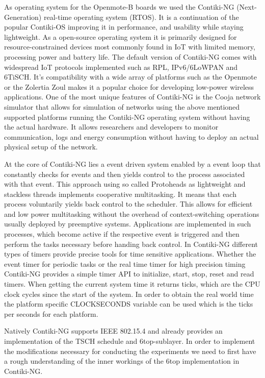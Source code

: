 \documentclass{comnets-thesis}
\begin{document}
As operating system for the Openmote-B boards we used the Contiki-NG (Next-Generation) real-time operating system (RTOS). It is a continuation of the popular Contiki-OS improving it in performance, and usability while staying lightweight.
As a open-source operating system it is primarily designed for resource-constrained devices most commonly found in \ac{IoT} with limited memory, processing power and battery life.
The default version of Contiki-NG comes with widespread \ac{IoT} protocols implemented such as \ac{RPL}, IPv6/\ac{6LoWPAN} and  \ac{6TiSCH}. It's compatibility with a wide array of platforms such as the Openmote or the Zolertia Zoul makes it a popular choice for developing low-power wireless applications. 
One of the most unique features of Contiki-NG is the Cooja network simulator that allows for simulation of networks using the above mentioned supported platforms running the Contiki-NG operating system without having the actual hardware. It allows researchers and developers to monitor communication, logs and energy consumption without having to deploy an actual physical setup of the network.

At the core of Contiki-NG lies a event driven system enabled by a event loop that constantly checks for events and then yields control to the process associated with that event. This approach using so called Protoheads as lightweight and stackless threads implements cooperative multitasking. It means that each process voluntarily yields back control to the scheduler. This allows for efficient and low power multitasking without the overhead of context-switching operations usually deployed by preemptive systems.
Applications are implemented in such processes, which become active if the respective event is triggered and then perform the tasks necessary before handing back control.
In Contiki-NG different types of timers provide precise tools for time sensitive applications. Whether the event timer for periodic tasks or the real time timer for high precision timing Contiki-NG provides a simple timer API to initialize, start, stop, reset and read timers. When getting the current system time it returns ticks, which are the CPU clock cycles since the start of the system. In order to obtain the real world time the platform specific CLOCKSECONDS variable can be used which is the ticks per seconds for each platform.

Natively Contiki-NG supports IEEE 802.15.4 and already provides an implementation of the \ac{TSCH} schedule and \ac{6top}-sublayer. In order to implement the modifications necessary for conducting the experiments we need to first have a rough understanding of the inner workings of the \ac{6top} implementation in Contiki-NG. 
\end{document}
